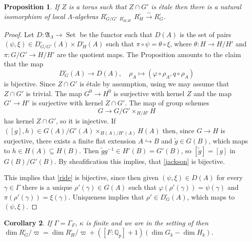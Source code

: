 \documentclass{amsart}
\newtheorem{prop}{Proposition}[section]
\newtheorem{cor}[prop]{Corollary}
\theoremstyle{definition}
\theoremstyle{remark}
\DeclareMathOperator{\Set}{Set}
\newcommand{\Qp}{\mathbb {Q}_p}
\newcommand{\Aa}{\mathfrak A}
\DeclareMathOperator{\wtimes}{\widehat{\otimes}}
\newcommand{\eqto}{\xrightarrow{\sim}}
\begin{document}
\begin{prop}\label{nice_torus}
If $Z$ is a torus such that $Z \cap G'$ is \'etale then there is a natural isomorphism of local $\Lambda$-algebras 
$R^{\square}_{G/G'}\wtimes_{R^{\square}_{H/H'}} R^{\square}_{H} 
\eqto R^{\square}_{G}$. 
\end{prop}

\begin{proof} Let $D: \Aa_{\Lambda}\rightarrow \Set$ be the functor such that $D(A)$ is 
the set of pairs $(\psi, \xi)\in D^{\square}_{G/G'}(A)\times D^{\square}_{H}(A)$ such that 
$\pi\circ \psi = \theta \circ \xi$, where $\theta: H\rightarrow H/H'$ and $\pi: 
G/G'\rightarrow H/H'$ are the quotient maps. The Proposition amounts to the claim that the map 
\begin{equation}\label{ride}
D^{\square}_{G}(A)\rightarrow D(A),\quad \rho_A \mapsto (\varphi\circ \rho_A, q\circ \rho_A)
\end{equation}
is bijective.
Since $Z\cap G'$ is \'etale by assumption, using  we may assume that 
$Z\cap G'$ is trivial. 
The map $G^0 \to H^0$ is surjective with kernel $Z$ and the map $G' \to H'$ 
is surjective with kernel $Z \cap G'$.
The map of group schemes 
\begin{equation}\label{jackson}
 G \rightarrow G/G'\times_{H/H'} H
 \end{equation}
has kernel $Z\cap G'$, so it is injective. If 
$([g],h) \in G(A)/G'(A) \times_{H(A)/H'(A)} H(A)$
then, since $G\rightarrow H$ is surjective,  there exists a finite flat extension 
$A \hookrightarrow B$ and $\tilde g\in G(B)$, which maps to $h\in H(A)\subseteq H(B)$.
Then  $\tilde g g^{-1} \in H'(B) = G'(B)$, so $[\tilde g] = [g]$ in $G(B)/G'(B)$.
By sheafification this implies, that \eqref{jackson} is bijective.

This implies that \eqref{ride} is bijective, 
since then given $(\psi, \xi)\in D(A)$ for every $\gamma\in \Gamma$ there is a
unique $\rho'(\gamma)\in G(A)$ such that $\varphi(\rho'(\gamma))=\psi(\gamma)$ and 
$\pi(\rho'(\gamma))=\xi(\gamma)$. Uniqueness implies that $\rho'\in D^{\square}_{G}(A)$, 
which maps to $(\psi,\xi)$. 
\end{proof}

\begin{cor}\label{cor_nice_torus} If $\Gamma=\Gamma_F$, $\kappa$ is
finite and we are in the setting of  then 
$\dim R^{\square}_G/\varpi = \dim R^{\square}_H/\varpi + ([F:\Qp]+1)(\dim G_k - \dim H_k)$.
\end{cor}
\end{document}

